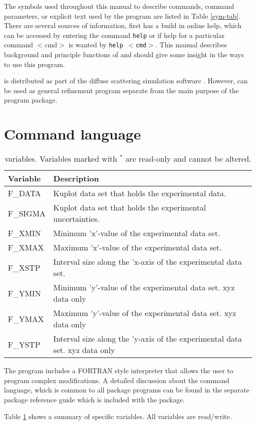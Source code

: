 The symbols used throughout this manual to describe commands,
command parameters, or explicit text used by the program \Refine     
are listed in Table \ref{sym-tab}. There are several sources
of information, first \Refine  has a build in online help, which
can be accessed by entering the command {\tt help} or if help for a
particular command $<$cmd$>$ is wanted by {\tt help $<$cmd$>$}. This
manual describes background and principle functions of \Refine
and should give some insight in the ways to use this program. \par

\Refine is distributed as part of the diffuse scattering
simulation software \discus.  However, \Refine can be used
as general refinement program separate from the main purpose of 
the \Discus program package. 


\section{Command language}

\begin{table}[!tb]
\centering
\begin{tabularx}{\textwidth}{|p{30mm}|X|}
  \hline
  {\bf Variable} & {\bf Description} \\
  \hline \hline
   F\_DATA       &  Kuplot data set that holds the experimental data.\\
  \hline 
   F\_SIGMA      &  Kuplot data set that holds the experimental uncertainties.\\
  \hline 
  F\_XMIN        &  Minimum 'x'-value of the experimental data set. \\
  \hline 
  F\_XMAX        &  Maximum 'x'-value of the experimental data set. \\
  \hline 
  F\_XSTP        &  Interval size along the 'x-axis of the experimental data set. \\
  \hline 
  F\_YMIN        &  Minimum 'y'-value of the experimental data set.
                    xyz data only \\
  \hline 
  F\_YMAX        &  Maximum 'y'-value of the experimental data set.
                    xyz data only \\
  \hline 
  F\_YSTP        &  Interval size along the 'y-axis of the experimental data set. 
                    xyz data only\\
  \hline
\end{tabularx}
\caption[\Refine variables]
        {\label{v1-tab}\Refine variables. Variables marked
         with $^{*}$ are read-only and cannot be altered.}
\end{table}

The program includes a FORTRAN style interpreter that allows the
user to program complex modifications. A detailed discussion about the 
command language, which is common to all \Discus package programs can be 
found in the separate \Discus package reference guide which is included with 
the package. 

Table \ref{v1-tab} shows a summary of \Refine specific 
variables. All variables are read/write.
